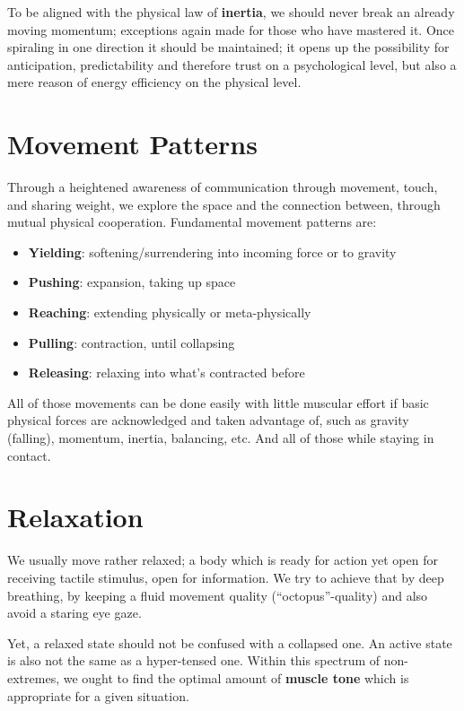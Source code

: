 To be aligned with the physical law of \textbf{inertia}, we should never break an already moving momentum; exceptions again made for those who have mastered it.
Once spiraling in one direction it should be maintained; it opens up the possibility for anticipation, predictability and therefore trust on a psychological level, but also a mere reason of energy efficiency on the physical level.

\section{Movement Patterns}\label{sec:movement-patterns}

Through a heightened awareness of communication through movement, touch, and sharing weight, we explore the space and the connection between, through mutual physical cooperation.
Fundamental movement patterns are:

\begin{itemize}
    \setlength\itemsep{0em}
    \item [] \textbf{Yielding}: softening/surrendering into incoming force or to gravity
    \item [] \textbf{Pushing}: expansion, taking up space
    \item [] \textbf{Reaching}: extending physically or meta-physically
    \item [] \textbf{Pulling}: contraction, until collapsing
    \item [] \textbf{Releasing}: relaxing into what's contracted before
\end{itemize}

All of those movements can be done easily with little muscular effort if basic physical forces are acknowledged and taken advantage of, such as gravity (falling), momentum, inertia, balancing, etc.
And all of those while staying in contact.

\section{Relaxation}\label{sec:relaxation}

We usually move rather relaxed; a body which is ready for action yet open for receiving tactile stimulus, open for information.
We try to achieve that by deep breathing, by keeping a fluid movement quality (``octopus''-quality) and also avoid a staring eye gaze.

Yet, a relaxed state should not be confused with a collapsed one.
An active state is also not the same as a hyper-tensed one.
Within this spectrum of non-extremes, we ought to find the optimal amount of \textbf{muscle tone} which is appropriate for a given situation.
